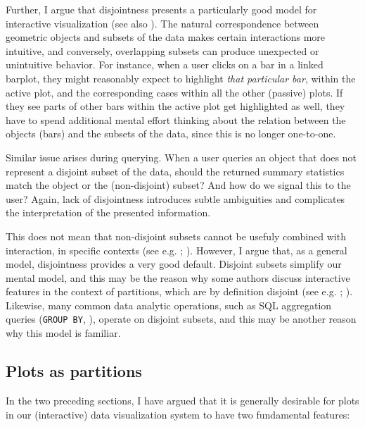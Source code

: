 \documentclass[
  openany]{book}
\theoremstyle{definition}
\theoremstyle{definition}
\theoremstyle{definition}
\theoremstyle{definition}
\theoremstyle{remark}
\begin{document}
Further, I argue that disjointness presents a particularly good model for interactive visualization (see also ). The natural correspondence between geometric objects and subsets of the data makes certain interactions more intuitive, and conversely, overlapping subsets can produce unexpected or unintuitive behavior. For instance, when a user clicks on a bar in a linked barplot, they might reasonably expect to highlight \emph{that particular bar}, within the active plot, and the corresponding cases within all the other (passive) plots. If they see parts of other bars within the active plot get highlighted as well, they have to spend additional mental effort thinking about the relation between the objects (bars) and the subsets of the data, since this is no longer one-to-one.

Similar issue arises during querying. When a user queries an object that does not represent a disjoint subset of the data, should the returned summary statistics match the object or the (non-disjoint) subset? And how do we signal this to the user? Again, lack of disjointness introduces subtle ambiguities and complicates the interpretation of the presented information.

This does not mean that non-disjoint subsets cannot be usefuly combined with interaction, in specific contexts (see e.g. ; ). However, I argue that, as a general model, disjointness provides a very good default. Disjoint subsets simplify our mental model, and this may be the reason why some authors discuss interactive features in the context of partitions, which are by definition disjoint (see e.g. ; ). Likewise, many common data analytic operations, such as SQL aggregation queries (\texttt{GROUP\ BY}, ), operate on disjoint subsets, and this may be another reason why this model is familiar.

\subsection{Plots as partitions}\label{plots-as-partitions}

In the two preceding sections, I have argued that it is generally desirable for plots in our (interactive) data visualization system to have two fundamental features:
\end{document}
